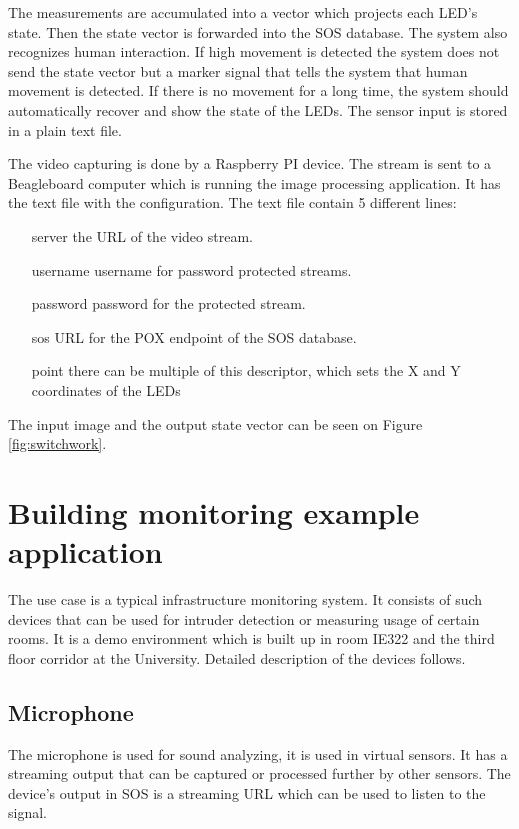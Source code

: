 The measurements are accumulated into a vector which projects each LED's state. Then the state vector is forwarded into the SOS database. The system also recognizes human interaction. If high movement is detected the system does not send the state vector but a marker signal that tells the system that human movement is detected. If there is no movement for a long time, the system should automatically recover and show the state of the LEDs. The sensor input is stored in a plain text file.

The video capturing is done by a Raspberry PI device. The stream is sent to a Beagleboard computer which is running the image processing application. It has the text file with the configuration. The text file contain 5 different lines:
\begin{itemize}
	\item[server] the URL of the video stream.
	\item[username] username for password protected streams.
	\item[password] password for the protected stream.
	\item[sos] URL for the POX endpoint of the SOS database.
	\item[point] there can be multiple of this descriptor, which sets the X and Y coordinates of the LEDs
\end{itemize}	
The input image and the output state vector can be seen on Figure \ref{fig:switchwork}.


\section{Building monitoring example application}

The use case is a typical infrastructure monitoring system. It consists of such devices that can be used for intruder detection or measuring usage of certain rooms. It is a demo environment which is built up in room IE322 and the third floor corridor at the University.
Detailed description of the devices follows.

\subsection*{Microphone}
 The microphone is used for sound analyzing, it is used in virtual sensors. It has a streaming output that can be captured or processed further by other sensors. The device's output in SOS is a streaming URL which can be used to listen to the signal. 
 
